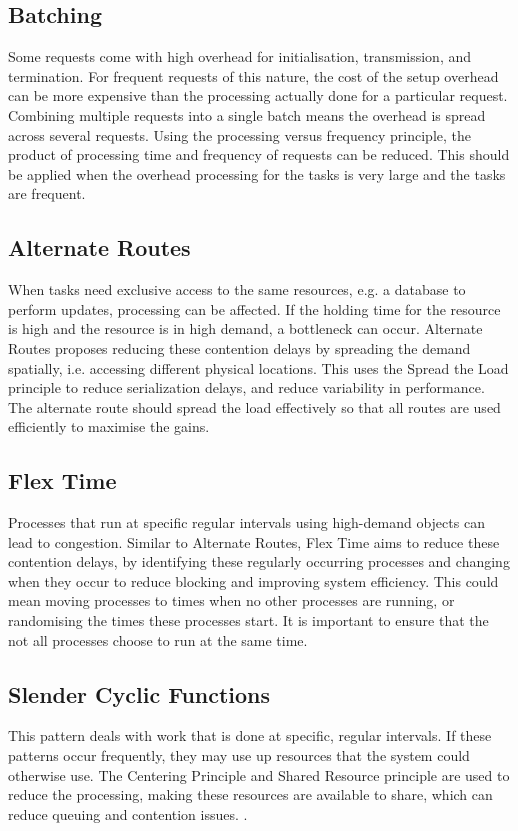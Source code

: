 \documentclass[a4paper,11pt,article,oneside]{memoir}
\begin{document}
	\subsection{Batching}
	Some requests come with high overhead for initialisation, transmission, and termination. For frequent requests of this nature, the cost of the setup overhead can be more expensive than the processing actually done for a particular request. Combining multiple requests into a single batch means the overhead is spread across several requests. Using the processing versus frequency principle, the product of processing time and frequency of requests can be reduced. This should be applied when the overhead processing for the tasks is very large and the tasks are frequent.
	
	\subsection{Alternate Routes}
	When tasks need exclusive access to the same resources, e.g. a database to perform updates, processing can be affected. If the holding time for the resource is high and the resource is in high demand, a bottleneck can occur. Alternate Routes proposes reducing these contention delays by spreading the demand spatially, i.e. accessing different physical locations. This uses the Spread the Load principle to reduce serialization delays, and reduce variability in performance. The alternate route should spread the load effectively so that all routes are used efficiently to maximise the gains.
	
	\subsection{Flex Time}
	Processes that run at specific regular intervals using high-demand objects can lead to congestion. Similar to Alternate Routes, Flex Time aims to reduce these contention delays, by identifying these regularly occurring processes and changing when they occur to reduce blocking and improving system efficiency. This could mean moving processes to times when no other processes are running, or randomising the times these processes start. It is important to ensure that the not all processes choose to run at the same time.
	
	\subsection{Slender Cyclic Functions}
	This pattern deals with work that is done at specific, regular intervals. If these patterns occur frequently, they may use up resources that the system could otherwise use. The Centering Principle and Shared Resource principle are used to reduce the processing, making these resources are available to share, which can reduce queuing and contention issues. . 
	
\end{document}

